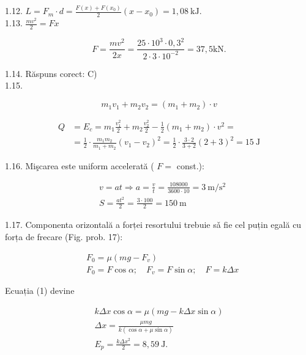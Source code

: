 \documentclass[10pt]{article}
\begin{document}
1.12. $L=F_{m} \cdot d=\frac{F(x)+F\left(x_{0}\right)}{2}\left(x-x_{0}\right)=1,08 \mathrm{~kJ}$.\\
1.13. $\frac{m v^{2}}{2}=F x$

$$
F=\frac{m v^{2}}{2 x}=\frac{25 \cdot 10^{3} \cdot 0,3^{2}}{2 \cdot 3 \cdot 10^{-2}}=37,5 \mathrm{kN} .
$$

1.14. Răspuns corect: C)\\
1.15.

$$
m_{1} v_{1}+m_{2} v_{2}=\left(m_{1}+m_{2}\right) \cdot v
$$

$$
\begin{aligned}
Q & =E_{c}=m_{1} \frac{v_{1}^{2}}{2}+m_{2} \frac{v_{2}^{2}}{2}-\frac{1}{2}\left(m_{1}+m_{2}\right) \cdot v^{2}= \\
& =\frac{1}{2} \cdot \frac{m_{1} m_{2}}{m_{1}+m_{2}}\left(v_{1}-v_{2}\right)^{2}=\frac{1}{2} \cdot \frac{3 \cdot 2}{3+2}(2+3)^{2}=15 \mathrm{~J}
\end{aligned}
$$

1.16. Mişcarea este uniform accelerată ( $F=$ const.):

$$
\begin{aligned}
& v=a t \Rightarrow a=\frac{v}{t}=\frac{108000}{3600 \cdot 10}=3 \mathrm{~m} / \mathrm{s}^{2} \\
& S=\frac{a t^{2}}{2}=\frac{3 \cdot 100}{2}=150 \mathrm{~m}
\end{aligned}
$$

1.17. Componenta orizontală a forței resortului trebuie sǎ fie cel puțin egală cu forța de frecare (Fig. prob. 17):


\begin{align*}
& F_{0}=\mu\left(m g-F_{v}\right)  \tag{1}\\
& F_{0}=F \cos \alpha ; \quad F_{v}=F \sin \alpha ; \quad F=k \Delta x \tag{2}
\end{align*}


Ecuația (1) devine

$$
\begin{gathered}
k \Delta x \cos \alpha=\mu(m g-k \Delta x \sin \alpha) \\
\Delta x=\frac{\mu m g}{k(\cos \alpha+\mu \sin \alpha)} \\
E_{p}=\frac{k \Delta x^{2}}{2}=8,59 \mathrm{~J} .
\end{gathered}
$$
\end{document}
